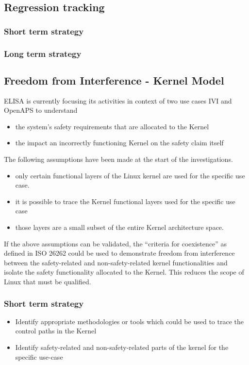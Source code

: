 \documentclass[12pt]{../Common_files/ElisaPaper}
\begin{document}
\subsection{Regression tracking}
\subsubsection{Short term strategy}
\subsubsection{Long term strategy}  

\subsection{Freedom from Interference - Kernel Model}
ELISA is currently focusing its activities in context of two use cases IVI and OpenAPS to understand
\begin{itemize} 
	\item the system's safety requirements that are allocated to the Kernel
	\item the impact an incorrectly functioning Kernel on the safety claim itself 
\end{itemize}
The following assumptions have been made at the start of the investigations.
\begin{itemize}
	\item 	only certain functional layers of the Linux kernel are used for the specific use case. 
	\item 	it is possible to trace the Kernel functional layers used for the specific use case
	\item   those layers are a small subset of the entire Kernel architecture space.
\end{itemize} 

If the above assumptions can be validated, the “criteria for coexistence”
as defined in ISO 26262 
could be used to demonstrate freedom from interference between the safety-related and non-safety-related kernel functionalities
and isolate the safety functionality allocated to the Kernel. 
This reduces the scope of Linux that must be qualified.

\subsubsection{Short term strategy}
\begin{itemize}
	\item	Identify appropriate methodologies or tools which could be used to trace the control paths in the Kernel 
	\item	Identify safety-related and non-safety-related parts of the kernel for the specific use-case
\end{itemize}
\end{document}
